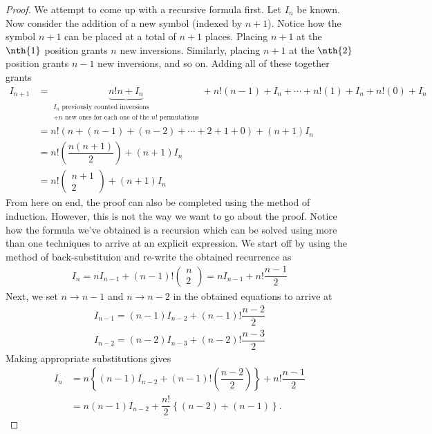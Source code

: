 \begin{proof}
We attempt to come up with a recursive formula first. Let $I_n$ be known. Now consider the addition of a new symbol (indexed by $n+1$). Notice how the symbol $n+1$ can be placed at a total of $n+1$ places. Placing $n+1$ at the $\nth{1}$ position grants $n$ new inversions. Similarly, placing $n+1$ at the $\nth{2}$ position grants $n-1$ new inversions, and so on. Adding all of these together grants 
\begin{align*}
I_{n+1}&=\underbrace{n!n + I_n}_{\substack{I_n \text{ previously counted inversions} \\ + n\text{ new ones for each one of the } n! \text{ permutations} }} + n!(n-1)+I_n + \cdots + n!(1)+I_n + n!(0)+I_n \\
	       &=n!\left(n+(n-1)+(n-2)+\cdots+2+1+0\right)+(n+1)I_n \\
	       &=n!\left(\dfrac{n(n+1)}{2}\right)+(n+1)I_n \\
	       &=n! \left(\begin{array}{c}n+1\\ 2\end{array}\right) + (n+1)I_n
\end{align*}
From here on end, the proof can also be completed using the method of induction. However, this is not the way we want to go about the proof. Notice how the formula we've obtained is a recursion which can be solved using more than one techniques to arrive at an explicit expression. We start off by using the method of back-substituion and re-write the obtained recurrence as
\begin{align*}
	I_n = nI_{n-1}+(n-1)! \left(\begin{array}{c}n\\ 2\end{array}\right) = nI_{n-1}+n!\dfrac{n-1}{2}
\end{align*}
Next, we set $n\to n-1$ and $n\to n-2$ in the obtained equations to arrive at
\begin{align*}
	I_{n-1} = (n-1)I_{n-2} + (n-1)!\dfrac{n-2}{2} \\
	I_{n-2} = (n-2)I_{n-3} + (n-2)!\dfrac{n-3}{2} 
\end{align*}
Making appropriate substitutions gives
\begin{align*}
	I_n &= n\left\{(n-1)I_{n-2}+(n-1)!\left(\dfrac{n-2}{2}\right)\right\}+n!\dfrac{n-1}{2} \\
	    &= n(n-1)I_{n-2}+\dfrac{n!}{2}\left\{(n-2)+(n-1) \right\}.
\end{align*}

\end{proof}
